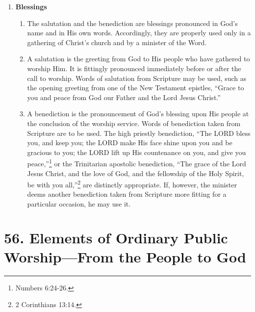 \documentclass[
]{book}
\providecommand{\tightlist}{%
  \setlength{\itemsep}{0pt}\setlength{\parskip}{0pt}}
\begin{document}
\begin{enumerate}
\def\labelenumi{\arabic{enumi}.}
\setcounter{enumi}{4}
\tightlist
\item
  \textbf{Blessings}

  \begin{enumerate}
  \def\labelenumii{\alph{enumii}.}
  \tightlist
  \item
    The salutation and the benediction are blessings pronounced in God's name and in His own words. Accordingly, they are properly used only in a gathering of Christ's church and by a minister of the Word.
  \item
    A salutation is the greeting from God to His people who have gathered to worship Him. It is fittingly pronounced immediately before or after the call to worship. Words of salutation from Scripture may be used, such as the opening greeting from one of the New Testament epistles, ``Grace to you and peace from God our Father and the Lord Jesus Christ.''
  \item
    A benediction is the pronouncement of God's blessing upon His people at the conclusion of the worship service. Words of benediction taken from Scripture are to be used. The high priestly benediction, ``The LORD bless you, and keep you; the LORD make His face shine upon you and be gracious to you; the LORD lift up His countenance on you, and give you peace,''\footnote{Numbers 6:24-26.} or the Trinitarian apostolic benediction, ``The grace of the Lord Jesus Christ, and the love of God, and the fellowship of the Holy Spirit, be with you all,''\footnote{2 Corinthians 13:14.} are distinctly appropriate. If, however, the minister deems another benediction taken from Scripture more fitting for a particular occasion, he may use it.
  \end{enumerate}
\end{enumerate}

\hypertarget{elements-of-ordinary-public-worshipfrom-the-people-to-god}{%
\section*{56. Elements of Ordinary Public Worship---From the People to God}\label{elements-of-ordinary-public-worshipfrom-the-people-to-god}}

\protect\hypertarget{chapter-slug-56-elements-of-ordinary-public-worship-from-the-people-to-god}{\href{}{}}
\end{document}
